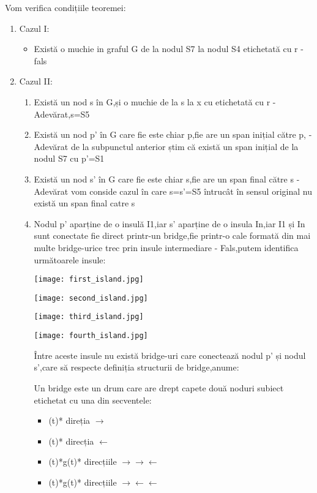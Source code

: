 \documentclass{article}
\begin{document}
     Vom verifica condițiile teoremei:
     \pagebreak
     \begin{enumerate}
        \item Cazul I:
            \begin{itemize}
                \item Există o muchie in graful G de la nodul S7 la nodul S4 etichetată cu r - fals
            \end{itemize}
        \item Cazul II:
            \begin{enumerate}
                \item Există un nod s în G,și o muchie de la s la x cu etichetată cu r - Adevărat,s=S5
                \item Există un nod p' în G care fie este chiar p,fie are un span inițial către p, - Adevărat de la subpunctul anterior știm că există un span inițial de la nodul S7 cu p'=S1
                \item Există un nod s' în G care fie este chiar s,fie are un span final către s - Adevărat vom conside cazul în care s=s'=S5 întrucât în sensul original nu există un span final catre s
                \item Nodul p' aparține de o insulă I1,iar s' aparține de o insula In,iar I1 și In sunt conectate fie direct printr-un bridge,fie printr-o cale formată din mai multe bridge-urice trec prin insule intermediare - Fals,putem identifica următoarele insule:
                
                \texttt{[image: first\_island.jpg]}
                
                \texttt{[image: second\_island.jpg]}
                
                \texttt{[image: third\_island.jpg]}
                
                \texttt{[image: fourth\_island.jpg]}
                
                
                Între aceste insule nu există  bridge-uri care conectează nodul p' și nodul s',care să respecte definiția structurii de bridge,anume:
                
                Un bridge este un drum care are drept capete două noduri subiect etichetat cu una din secventele:
                \begin{itemize}
                    \item (t)* direția $\rightarrow$
                    \item (t)* direcția $\leftarrow$
                    \item (t)*g(t)* direcțiile $\rightarrow\rightarrow\leftarrow$
                    \item (t)*g(t)* direcțiile $\rightarrow\leftarrow\leftarrow$
                \end{itemize}
                
            \end{enumerate}
     \end{enumerate}
     
\end{document}
